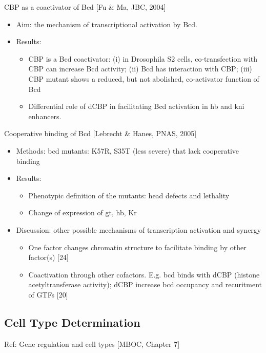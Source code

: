 \documentclass{report}
\begin{document}
CBP as a coactivator of Bcd [Fu \& Ma, JBC, 2004]
\begin{itemize}
	\item Aim: the mechanism of transcriptional activation by Bcd. 
	
	\item Results: 
	\begin{itemize}
		\item CBP is a Bcd coactivator: (i) in Drosophila S2 cells, co-transfection with CBP can increase Bcd activity; (ii) Bcd has interaction with CBP; (iii) CBP mutant shows a reduced, but not abolished, co-activator function of Bcd
		\item Differential role of dCBP in facilitating Bcd activation in hb and kni enhancers. 
	\end{itemize}
\end{itemize}

Cooperative binding of Bcd [Lebrecht \& Hanes, PNAS, 2005]
\begin{itemize}
	\item Methods: bcd mutants: K57R, S35T (less severe) that lack cooperative binding
	
	\item Results:
	\begin{itemize} 
		\item Phenotypic definition of the mutants: head defects and lethality
		\item Change of expression of gt, hb, Kr
	\end{itemize}
	
	\item Discussion: other possible mechanisms of transcription activation and synergy
	\begin{itemize}
		\item One factor changes chromatin structure to facilitate binding by other factor(s) [24]
		\item Coactivation through other cofactors. E.g. bcd binds with dCBP (histone acetyltransferase activity); dCBP increase bcd occupancy and recuritment of GTFs [20]
	\end{itemize}
\end{itemize}

\subsection{Cell Type Determination}

Ref: Gene regulation and cell types [MBOC, Chapter 7]
\end{document}
